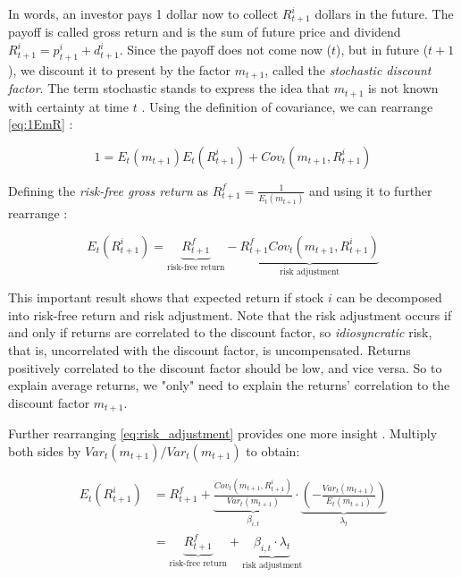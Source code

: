 	 		In words, an investor pays 1 dollar now to collect $R_{t+1}^i$ dollars in the future. The payoff is called gross return and is the sum of future price and dividend $R_{t+1}^i = p_{t+1}^i+ d_{t+1}^i$.  Since the payoff does not come now ($t$), but in future ($t+1$), we discount it to present by the factor $m_{t+1}$, called the \textit{stochastic discount factor}. The term stochastic stands to express the idea that $m_{t+1}$ is not known with certainty at time $t$ \citep{cochrane2009asset}.
	 		Using the definition of covariance, we can rearrange \ref{eq:1EmR} \citep{cochrane2009asset}:
	 		
	 		\begin{equation}
	 			1 = E_t(m_{t+1}) E_t(R_{t+1}^i) + Cov_t(m_{t+1},R_{t+1}^i) 
	 		\end{equation} 
	 		
	 		Defining the \textit{risk-free gross return} as $R_{t+1}^f=\frac{1}{E_t(m_{t+1})}$ and using it to further rearrange \citep{cochrane2009asset}:
	 		
	 		\begin{equation}
	 			E_t(R_{t+1}^i) = \underbrace{R_{t+1}^f}_\text{risk-free return}  -  \underbrace{R_{t+1}^f Cov_t(m_{t+1},R_{t+1}^i)}_\text{risk adjustment} \label{eq:risk_adjustment}
	 		\end{equation} 
	 		
	 		This important result shows that expected return if stock $i$ can be decomposed into risk-free return and risk adjustment. Note that the risk adjustment occurs if and only if returns are correlated to the discount factor, so \textit{idiosyncratic} risk, that is, uncorrelated with the discount factor, is uncompensated. Returns positively correlated to the discount factor should be low, and vice versa. So to explain average returns, we "only" need to explain the returns' correlation to the discount factor $m_{t+1}$. 
	 		
	 		Further rearranging \ref{eq:risk_adjustment} provides one more insight \citep{cochrane2009asset}. Multiply both sides by $Var_t(m_{t+1})/Var_t(m_{t+1})$ to obtain:
	 		
	 		\begin{align}
	 			E_t(R_{t+1}^i) 
	 			& = {R_{t+1}^f} + 
	 			\underbrace{
	 				\frac{Cov_t(m_{t+1},R_{t+1}^i)}{Var_t(m_{t+1})}
	 			}_\text{$\beta_{i,t}$} 
	 			\cdot 
	 			\underbrace{
	 				\left(-\frac{Var_t(m_{t+1})}{E_t(m_{t+1})}\right)
	 			}_\text{$\lambda_{t}$} \label{eq:factor_model} \\
	 			& = \underbrace{{R_{t+1}^f}
	 			}_\text{risk-free return} 
	 			+ 
	 			\underbrace{\beta_{i,t} \cdot \lambda_{t}
	 			}_\text{risk adjustment} \label{eq:beta_reprezentation}
	 		\end{align} 
	 		
